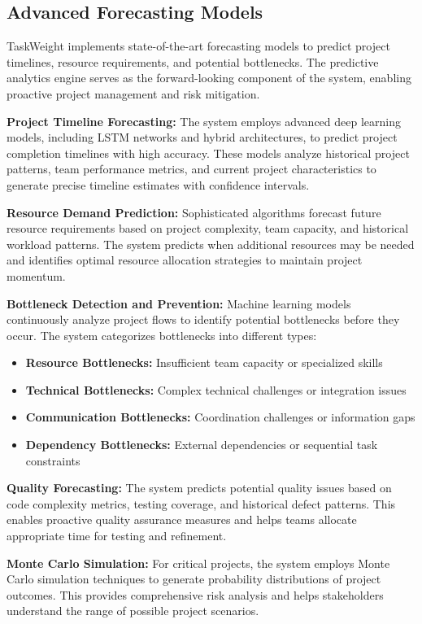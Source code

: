 \documentclass[12pt,a4paper]{article}
\begin{document}
\subsection{Advanced Forecasting Models}

TaskWeight implements state-of-the-art forecasting models to predict project timelines, resource requirements, and potential bottlenecks. The predictive analytics engine serves as the forward-looking component of the system, enabling proactive project management and risk mitigation.

\textbf{Project Timeline Forecasting:} The system employs advanced deep learning models, including LSTM networks and hybrid architectures, to predict project completion timelines with high accuracy. These models analyze historical project patterns, team performance metrics, and current project characteristics to generate precise timeline estimates with confidence intervals.

\textbf{Resource Demand Prediction:} Sophisticated algorithms forecast future resource requirements based on project complexity, team capacity, and historical workload patterns. The system predicts when additional resources may be needed and identifies optimal resource allocation strategies to maintain project momentum.

\textbf{Bottleneck Detection and Prevention:} Machine learning models continuously analyze project flows to identify potential bottlenecks before they occur. The system categorizes bottlenecks into different types:

\begin{itemize}
\item \textbf{Resource Bottlenecks:} Insufficient team capacity or specialized skills
\item \textbf{Technical Bottlenecks:} Complex technical challenges or integration issues
\item \textbf{Communication Bottlenecks:} Coordination challenges or information gaps
\item \textbf{Dependency Bottlenecks:} External dependencies or sequential task constraints
\end{itemize}

\textbf{Quality Forecasting:} The system predicts potential quality issues based on code complexity metrics, testing coverage, and historical defect patterns. This enables proactive quality assurance measures and helps teams allocate appropriate time for testing and refinement.

\textbf{Monte Carlo Simulation:} For critical projects, the system employs Monte Carlo simulation techniques to generate probability distributions of project outcomes. This provides comprehensive risk analysis and helps stakeholders understand the range of possible project scenarios.
\end{document}
